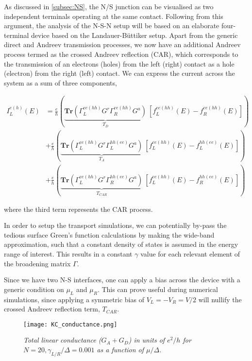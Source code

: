 As discussed in \ref{subsec:NS}, the N/S junction can be visualised as two independent terminals operating at the same contact. Following from this argument, the analysis of the N-S-N setup will be based on an elaborate four-terminal device based on the Landauer-Büttiker setup. Apart from the generic direct and Andreev transmission processes, we now have an additional Andreev process termed as the crossed Andreev reflection (CAR), which corresponds to the transmission of an electrons (holes) from the left (right) contact as a hole (electron) from the right (left) contact. We can express the current across the system as a sum of three components,

\begin{equation}
    \begin{aligned}
        I^{e(h)}_{L}(E) &= \frac{e}{h}\left(\underbrace{\textbf{Tr}(\Gamma_{L}^{ee(hh)}G^{r}\Gamma_{R}^{ee(hh)}G^{a})}_{T_{D}}\:[f_{L}^{ee(hh)}(E)-f_{R}^{ee(hh)}(E)]\right)  \\
       &+ \frac{e}{h}\left(\underbrace{\textbf{Tr}(\Gamma_{L}^{ee(hh)}G^{r}\Gamma_{L}^{hh(ee)}G^{a})}_{T_{A}}\:[f_{L}^{ee(hh)}(E)-f_{L}^{hh(ee)}(E)]\right) \\
       &+ \frac{e}{h}\left(\underbrace{\textbf{Tr}(\Gamma_{L}^{ee(hh)}G^{r}\Gamma_{R}^{hh(ee)}G^{a})}_{T_{CAR}}\:[f_{L}^{ee(hh)}(E)-f_{R}^{hh(ee)}(E)]\right)
    \end{aligned}    
\end{equation}

where the third term represents the CAR process. \par 

In order to setup the transport simulations, we can potentially by-pass the tedious surface Green's function calculations by making the wide-band approximation, such that a constant density of states is assumed in the energy range of interest. This results in a constant $\gamma$ value for each relevant element of the broadening matrix $\Gamma$. \par 

Since we have two N-S interfaces, one can apply a bias across the device with a generic condition on $\mu_{L}$ and $\mu_{R}$. This can prove useful during numerical simulations, since applying a symmetric bias of $V_{L} = -V_{R} = V/2$ will nullify the crossed Andreev reflection term, $T_{CAR}$. \par 

\vspace{1cm}

\begin{figure}[h]
\centering
\texttt{[image: KC\_conductance.png]}
\caption{\textit{Total linear conductance ($G_{A}+G_{D}$) in units of $e^{2}/h$ for $N = 20, \gamma_{L/R}/\Delta = 0.001$ as a function of $\mu/\Delta$.}}
\end{figure}

